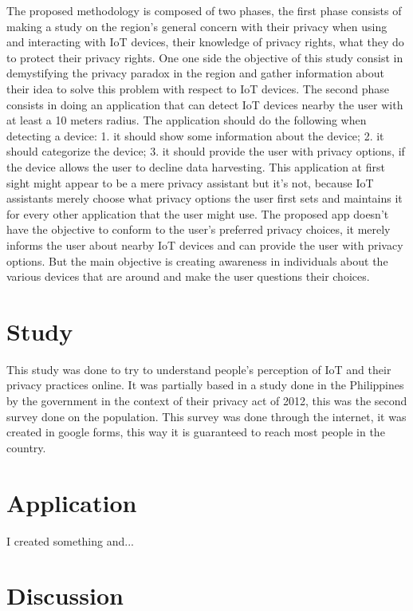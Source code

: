 \documentclass[conference]{IEEEtran}
\begin{document}
The proposed methodology is composed of two phases, the first phase consists
of making a study on the region's general concern with their privacy when using
and interacting with IoT devices, their knowledge of privacy rights, what they
do to protect their privacy rights. One one side the objective of this study
consist in demystifying the privacy paradox in the region and gather information
about their idea to solve this problem with respect to IoT devices. The second
phase consists in doing an application that can detect IoT devices nearby the
user with at least a 10 meters radius. The application should do the following
when detecting a device:
1. it should show some information about the device;
2. it should categorize the device;
3. it should provide the user with privacy options, if the device allows the
user to decline data harvesting.
This application at first sight might appear to be a mere privacy assistant but
it's not, because IoT assistants merely choose what privacy options the user
first sets and maintains it for every other application that the user might use.
The proposed app doesn't have the objective to conform to the user's preferred
privacy choices, it merely informs the user about nearby IoT devices and can
provide the user with privacy options. But the main objective is creating
awareness in individuals about the various devices that are around and make the
user questions their choices.

\section{Study}

This study was done to try to understand people's perception of IoT and their
privacy practices online. It was partially based in a study done in the Philippines
by the government in the context of their privacy act of 2012, this was the second
survey done on the population. This survey was done through the internet, it
was created in google forms, this way it is guaranteed to reach most people in
the country.

\section{Application}

I created something and...

\section{Discussion}
\end{document}

